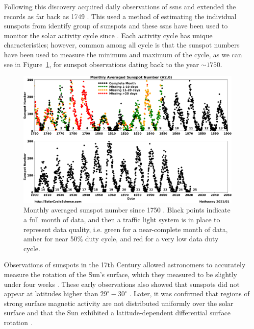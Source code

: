 Following this discovery \citet{wolf_extract_1859} acquired daily observations of \glspl{ssn} and extended the records as far back as 1749 \citep{hathaway_solar_2015}. This used a method of estimating the individual sunspots from identify group of sunspots and these \glspl{ssn} have been used to monitor the solar activity cycle since \citep{wolf_extract_1859, wolf_abstract_1861}. Each activity cycle has unique characteristics; however, common among all cycle is that the sunspot numbers have been used to measure the minimum and maximum of the cycle, as we can see in Figure~\ref{fig:ssn}, for sunspot observations dating back to the year $\sim1750$.

\begin{figure}[ht!]
	\centering
	\includegraphics[width=\columnwidth]{SSN_monthly_landscape.png}
	\caption{Monthly averaged sunspot number since 1750 \citep{hathaway_solar_2017}. Black points indicate a full month of data, and then a traffic light system is in place to represent data quality, i.e. green for a near-complete month of data, amber for near 50\% duty cycle, and red for a very low data duty cycle.}
	\label{fig:ssn}
\end{figure}

Observations of sunspots in the 17th Century allowed astronomers to accurately measure the rotation of the Sun's surface, which they measured to be slightly under four weeks \citep{casanovas_early_1997, casas_solar_2006, luminet_reception_2017}. These early observations also showed that sunspots did not appear at latitudes higher than $29^{\circ}-30^{\circ}$ \citep{casanovas_early_1997}. Later, it was confirmed that regions of strong surface magnetic activity are not distributed uniformly over the solar surface and that the Sun exhibited a latitude-dependent differential surface rotation \citep{lee_cyril_1858}. %

